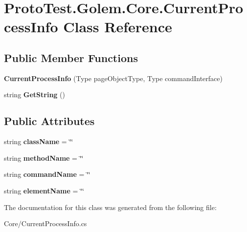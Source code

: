 \hypertarget{class_proto_test_1_1_golem_1_1_core_1_1_current_process_info}{\section{Proto\-Test.\-Golem.\-Core.\-Current\-Process\-Info Class Reference}
\label{class_proto_test_1_1_golem_1_1_core_1_1_current_process_info}
}
\subsection*{Public Member Functions}
\begin{DoxyCompactItemize}
\item 
\hypertarget{class_proto_test_1_1_golem_1_1_core_1_1_current_process_info_a3816720f515737a85cc51300a1edbe84}{{\bfseries Current\-Process\-Info} (Type page\-Object\-Type, Type command\-Interface)}\label{class_proto_test_1_1_golem_1_1_core_1_1_current_process_info_a3816720f515737a85cc51300a1edbe84}

\item 
\hypertarget{class_proto_test_1_1_golem_1_1_core_1_1_current_process_info_af23b8c795a70a220b23b4ec2b25eb340}{string {\bfseries Get\-String} ()}\label{class_proto_test_1_1_golem_1_1_core_1_1_current_process_info_af23b8c795a70a220b23b4ec2b25eb340}

\end{DoxyCompactItemize}
\subsection*{Public Attributes}
\begin{DoxyCompactItemize}
\item 
\hypertarget{class_proto_test_1_1_golem_1_1_core_1_1_current_process_info_a51e7f45bf77c9f3463b1c0fc06fe3142}{string {\bfseries class\-Name} = \char`\"{}\char`\"{}}\label{class_proto_test_1_1_golem_1_1_core_1_1_current_process_info_a51e7f45bf77c9f3463b1c0fc06fe3142}

\item 
\hypertarget{class_proto_test_1_1_golem_1_1_core_1_1_current_process_info_ab165756c3e59288b3ba8f964e2159ba4}{string {\bfseries method\-Name} = \char`\"{}\char`\"{}}\label{class_proto_test_1_1_golem_1_1_core_1_1_current_process_info_ab165756c3e59288b3ba8f964e2159ba4}

\item 
\hypertarget{class_proto_test_1_1_golem_1_1_core_1_1_current_process_info_a3a8b28aacc9deaa7b20a71c21f49acbe}{string {\bfseries command\-Name} = \char`\"{}\char`\"{}}\label{class_proto_test_1_1_golem_1_1_core_1_1_current_process_info_a3a8b28aacc9deaa7b20a71c21f49acbe}

\item 
\hypertarget{class_proto_test_1_1_golem_1_1_core_1_1_current_process_info_a75938a11d3ce3a1afb7e5150c9c15c29}{string {\bfseries element\-Name} = \char`\"{}\char`\"{}}\label{class_proto_test_1_1_golem_1_1_core_1_1_current_process_info_a75938a11d3ce3a1afb7e5150c9c15c29}

\end{DoxyCompactItemize}


The documentation for this class was generated from the following file\-:\begin{DoxyCompactItemize}
\item 
Core/Current\-Process\-Info.\-cs\end{DoxyCompactItemize}
